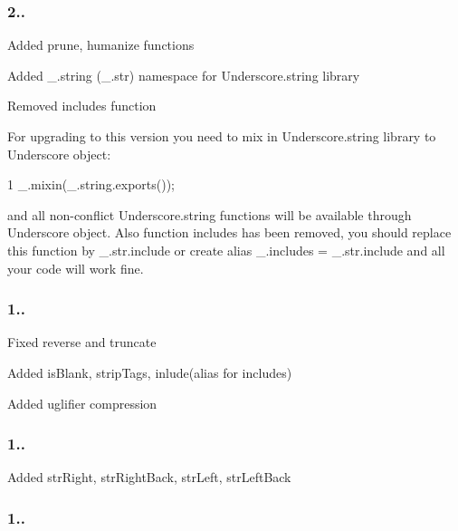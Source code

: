\subsubsection*{2..}


\begin{DoxyItemize}
\item Added prune, humanize functions
\item Added \+\_\+.\+string (\+\_\+.\+str) namespace for Underscore.\+string library
\item Removed includes function
\end{DoxyItemize}

For upgrading to this version you need to mix in Underscore.\+string library to Underscore object\+:


\begin{DoxyCode}
1 \_.mixin(\_.string.exports());
\end{DoxyCode}


and all non-\/conflict Underscore.\+string functions will be available through Underscore object. Also function {\ttfamily includes} has been removed, you should replace this function by {\ttfamily \+\_\+.\+str.\+include} or create alias {\ttfamily \+\_\+.\+includes = \+\_\+.\+str.\+include} and all your code will work fine.

\subsubsection*{1..}


\begin{DoxyItemize}
\item Fixed reverse and truncate
\item Added is\+Blank, strip\+Tags, inlude(alias for includes)
\item Added uglifier compression
\end{DoxyItemize}

\subsubsection*{1..}


\begin{DoxyItemize}
\item Added str\+Right, str\+Right\+Back, str\+Left, str\+Left\+Back
\end{DoxyItemize}

\subsubsection*{1..}


